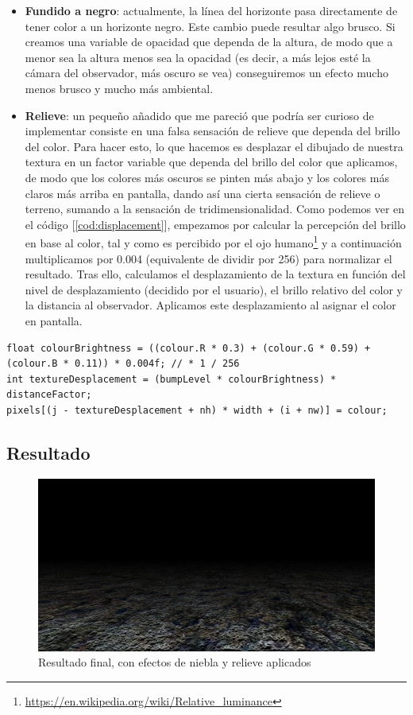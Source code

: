 \begin{itemize}
	\item \textbf{Fundido a negro}: actualmente, la línea del horizonte pasa directamente de tener color a un horizonte negro. Este cambio puede resultar algo brusco. Si creamos una variable de opacidad que dependa de la altura, de modo que a menor sea la altura menos sea la opacidad (es decir, a más lejos esté la cámara del observador, más oscuro se vea) conseguiremos un efecto mucho menos brusco y mucho más ambiental. 
	\item \textbf{Relieve}: un pequeño añadido que me pareció que podría ser curioso de implementar consiste en una falsa sensación de relieve que dependa del brillo del color. Para hacer esto, lo que hacemos es desplazar el dibujado de nuestra textura en un factor variable que dependa del brillo del color que aplicamos, de modo que los colores más oscuros se pinten más abajo y los colores más claros más arriba en pantalla, dando así una cierta sensación de relieve o terreno, sumando a la sensación de tridimensionalidad. Como podemos ver en el código [\ref{cod:displacement}], empezamos por calcular la percepción del brillo en base al color, tal y como es percibido por el ojo humano\footnote{\url{https://en.wikipedia.org/wiki/Relative_luminance}} y a continuación multiplicamos por 0.004 (equivalente de dividir por 256) para normalizar el resultado. Tras ello, calculamos el desplazamiento de la textura en función del nivel de desplazamiento (decidido por el usuario), el brillo relativo del color y la distancia al observador. Aplicamos este desplazamiento al asignar el color en pantalla.
\end{itemize}

\begin{lstlisting}[style=C-color, caption={Código para calcular el desplamiento de la textura}, label=cod:displacement]
float colourBrightness = ((colour.R * 0.3) + (colour.G * 0.59) + (colour.B * 0.11)) * 0.004f; // * 1 / 256
int textureDesplacement = (bumpLevel * colourBrightness) * distanceFactor;
pixels[(j - textureDesplacement + nh) * width + (i + nw)] = colour;
\end{lstlisting}

\subsection{Resultado}

\begin{figure}[h]
	\centering
	\includegraphics[width=12cm]{archivos/planes3}
	\caption{Resultado final, con efectos de niebla y relieve aplicados}
	\label{fig:planes3}
\end{figure}

